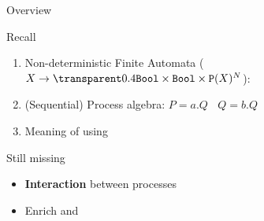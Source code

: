 \documentclass[aspectratio=169]{beamer}
\begin{document}
\begin{slide}{Overview}

\begin{block}{Recall}
\begin{enumerate}
  \item Non-deterministic Finite Automata ($X \to \faded{\mathtt{Bool}} \times \mathtt{Bool} \times \mathtt{P}(X)^{\Act}$):
  \item (Sequential) Process algebra:
    $P = a.Q ~~~~ Q=b.Q$

  \item Meaning of  using 
\end{enumerate}  
\end{block}

\begin{block}{Still missing}
\begin{itemize}
  \item \alert{\textbf{Interaction}} between processes
  \item Enrich  and 
\end{itemize}
\end{block}

\end{slide}
\end{document}
